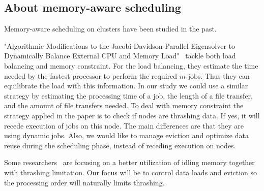 \documentclass[a4paper]{article}
\begin{document}
\subsection{About memory-aware scheduling}
Memory-aware scheduling on clusters have been studied in the past.
 
"Algorithmic Modifications to the
Jacobi-Davidson Parallel Eigensolver to Dynamically Balance External CPU and Memory Load"~\cite{loadbalance_and_trashing} tackle both load balancing and memory constraint. For the load balancing, they 
estimate the time needed by the fastest processor to perform the required $m$ jobs. Thus they can equilibrate the load
with this information. In our study we could use a similar strategy by estimating the 
processing time of a job, the length of a file transfer, and the amount of file transfers needed.
To deal with memory constraint the strategy applied in the paper is to check if 
nodes are thrashing data. If yes, it will recede execution of jobs on this node.
The main differences are that they are using dynamic jobs. Also, we would like to 
manage eviction and optimize data reuse during the scheduling phase, instead of
receding execution on nodes.

Some researchers~\cite{Nikolopoulos2003AdaptiveSU}
are focusing on a better utilization of idling memory together with 
thrashing limitation. Our focus will be to control data loads and eviction so the
processing order will naturally limits thrashing.
\end{document}
